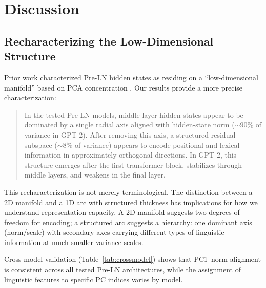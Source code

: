 \documentclass[11pt,a4paper]{article}
\begin{document}
\section{Discussion}

\subsection{Recharacterizing the Low-Dimensional Structure}

Prior work characterized Pre-LN hidden states as residing on a ``low-dimensional manifold'' based on PCA concentration \citep{ethayarajh2019contextual,aghajanyan2021intrinsic}. Our results provide a more precise characterization:

\begin{quote}
In the tested Pre-LN models, middle-layer hidden states appear to be dominated by a single radial axis aligned with hidden-state norm (${\sim}90$\% of variance in GPT-2). After removing this axis, a structured residual subspace (${\sim}8$\% of variance) appears to encode positional and lexical information in approximately orthogonal directions. In GPT-2, this structure emerges after the first transformer block, stabilizes through middle layers, and weakens in the final layer.
\end{quote}

This recharacterization is not merely terminological. The distinction between a 2D manifold and a 1D arc with structured thickness has implications for how we understand representation capacity. A 2D manifold suggests two degrees of freedom for encoding; a structured arc suggests a hierarchy: one dominant axis (norm/scale) with secondary axes carrying different types of linguistic information at much smaller variance scales.

Cross-model validation (Table~\ref{tab:crossmodel}) shows that PC1--norm alignment is consistent across all tested Pre-LN architectures, while the assignment of linguistic features to specific PC indices varies by model.
\end{document}
